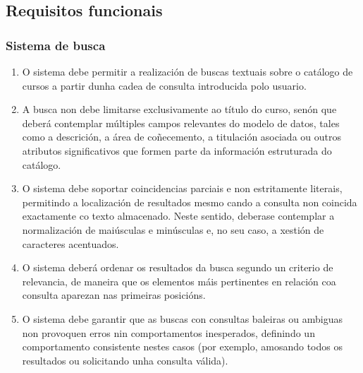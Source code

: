 \documentclass[%
    a4paper,               %
    twoside,                %
    parskip=full,           %
    10pt,                   %
    titlepage=on,           %
    captions=tableabove,    %
]{article}                  %
\begin{document}
\subsection{Requisitos funcionais}

\subsubsection{Sistema de busca}
\begin{enumerate}
    \item O sistema debe permitir a realización de buscas textuais sobre o catálogo de cursos a partir dunha cadea de consulta introducida polo usuario.

    \item A busca non debe limitarse exclusivamente ao título do curso, senón que deberá contemplar múltiples campos relevantes do modelo de datos, tales como a descrición, a área de coñecemento, a titulación asociada ou outros atributos significativos que formen parte da información estruturada do catálogo.

    \item O sistema debe soportar coincidencias parciais e non estritamente literais, permitindo a localización de resultados mesmo cando a consulta non coincida exactamente co texto almacenado. Neste sentido, deberase contemplar a normalización de maiúsculas e minúsculas e, no seu caso, a xestión de caracteres acentuados.

    \item O sistema deberá ordenar os resultados da busca segundo un criterio de relevancia, de maneira que os elementos máis pertinentes en relación coa consulta aparezan nas primeiras posicións.

    \item O sistema debe garantir que as buscas con consultas baleiras ou ambiguas non provoquen erros nin comportamentos inesperados, definindo un comportamento consistente nestes casos (por exemplo, amosando todos os resultados ou solicitando unha consulta válida).


\end{enumerate}
\end{document}
